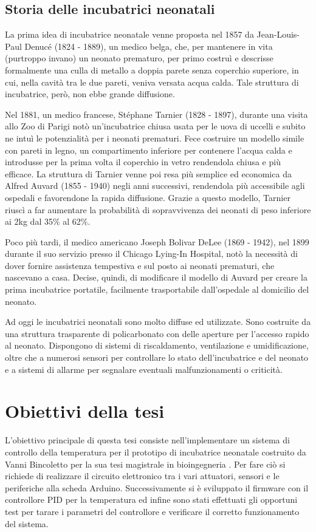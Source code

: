 \subsection{Storia delle incubatrici neonatali}
La prima idea di incubatrice neonatale venne proposta nel 1857 da Jean-Louis-Paul Denucé (1824 - 1889), un medico belga,
che, per mantenere in vita (purtroppo invano) un neonato prematuro, per primo costruì e descrisse formalmente una
culla di metallo a doppia parete senza coperchio superiore, in cui, nella cavità tra le due pareti, veniva versata acqua
calda. Tale struttura di incubatrice, però, non ebbe grande diffusione. \cite{dunn2002}

Nel 1881, un medico francese, Stéphane Tarnier (1828 - 1897), durante una visita allo Zoo di Parigi notò un'incubatrice
chiusa usata per le uova di uccelli e subito ne intuì le potenzialità per i neonati prematuri. Fece costruire un
modello simile con pareti in legno, un compartimento inferiore per contenere l'acqua calda e introdusse per la prima volta
il coperchio in vetro rendendola chiusa e più efficace. La struttura di Tarnier venne poi resa più semplice ed economica
da Alfred Auvard (1855 - 1940) negli anni successivi, rendendola più accessibile agli ospedali e favorendone la rapida
diffusione. Grazie a questo modello, Tarnier riuscì a far aumentare la probabilità di sopravvivenza dei neonati di peso
inferiore ai 2kg dal 35\% al 62\%. \cite{dunn2002}

Poco più tardi, il medico americano Joseph Bolivar DeLee (1869 - 1942), nel 1899 durante il suo servizio presso il Chicago
Lying-In Hospital, notò la necessità di dover fornire assistenza tempestiva e sul posto ai neonati prematuri, che nascevano
a casa. Decise, quindi, di modificare il modello di Auvard per creare la prima incubatrice portatile, facilmente trasportabile
dall'ospedale al domicilio del neonato. \cite{baker2000}

Ad oggi le incubatrici neonatali sono molto diffuse ed utilizzate. Sono costruite da una struttura trasparente di policarbonato
con delle aperture per l'accesso rapido al neonato. Dispongono di sistemi di riscaldamento, ventilazione e umidificazione,
oltre che a numerosi sensori per controllare lo stato dell'incubatrice e del neonato e a sistemi di allarme per segnalare
eventuali malfunzionamenti o criticità.

\section{Obiettivi della tesi}
L'obiettivo principale di questa tesi consiste nell'implementare un sistema di controllo della temperatura per il prototipo
di incubatrice neonatale costruito da Vanni Bincoletto per la sua tesi magistrale in bioingegneria \cite{bincoletto2025}.
Per fare ciò si richiede di realizzare il circuito elettronico tra i vari attuatori, sensori e le periferiche alla scheda
Arduino. Successivamente si è sviluppato il firmware con il controllore PID per la temperatura ed infine sono stati effettuati
gli opportuni test per tarare i parametri del controllore e verificare il corretto funzionamento del sistema.

